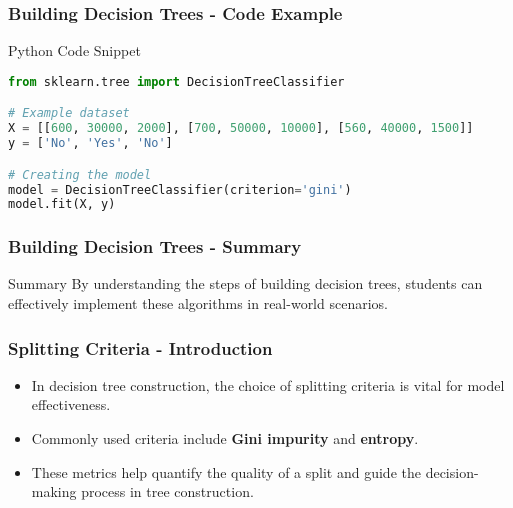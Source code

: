 \documentclass[aspectratio=169]{beamer}
\begin{document}
\begin{frame}[fragile]
    \frametitle{Building Decision Trees - Code Example}
    \begin{block}{Python Code Snippet}
        \begin{lstlisting}[language=Python]
from sklearn.tree import DecisionTreeClassifier

# Example dataset
X = [[600, 30000, 2000], [700, 50000, 10000], [560, 40000, 1500]]
y = ['No', 'Yes', 'No']

# Creating the model
model = DecisionTreeClassifier(criterion='gini')
model.fit(X, y)
        \end{lstlisting}
    \end{block}
\end{frame}

\begin{frame}[fragile]
    \frametitle{Building Decision Trees - Summary}
    \begin{block}{Summary}
        By understanding the steps of building decision trees, students can effectively implement these algorithms in real-world scenarios.
    \end{block}
\end{frame}

\begin{frame}[fragile]
    \frametitle{Splitting Criteria - Introduction}
    \begin{itemize}
        \item In decision tree construction, the choice of splitting criteria is vital for model effectiveness.
        \item Commonly used criteria include \textbf{Gini impurity} and \textbf{entropy}.
        \item These metrics help quantify the quality of a split and guide the decision-making process in tree construction.
    \end{itemize}
\end{frame}
\end{document}
